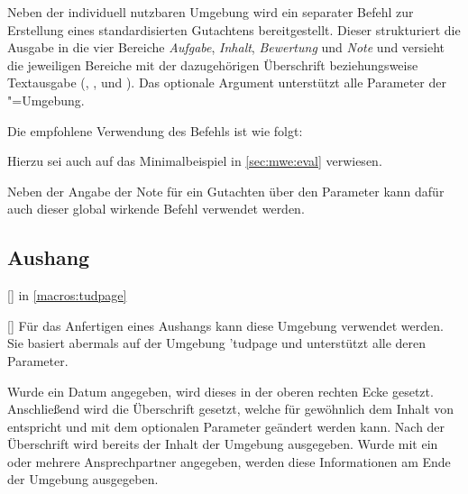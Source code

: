 \documentclass[%
  english,ngerman,%
  headings=optiontoheadandtoc,captions=tableheading,numbers=noenddot,%
  chapterpage,cdfoot,%
]{tudscrman}
\begin{document}
\begin{Declaration}{\LParameter%
}
\printdeclarationlist%
Neben der individuell nutzbaren Umgebung  wird ein 
separater Befehl zur Erstellung eines standardisierten Gutachtens 
bereitgestellt. Dieser strukturiert die Ausgabe in die vier Bereiche 
\emph{Aufgabe}, \emph{Inhalt}, \emph{Bewertung} und \emph{Note} und versieht 
die jeweiligen Bereiche mit der dazugehörigen Überschrift beziehungsweise 
Textausgabe (, ,  und 
). Das optionale Argument unterstützt alle Parameter der 
"=Umgebung.
%
\end{Declaration}
%
\begin{Example}
Die empfohlene Verwendung des Befehls  ist wie folgt:
\begin{code}[escapechar=§]
\end{code}
Hierzu sei auch auf das Minimalbeispiel in \autoref{sec:mwe:eval} verwiesen.
\end{Example}

\begin{Declaration}{}
\printdeclarationlist%
Neben der Angabe der Note für ein Gutachten über den Parameter 
 kann dafür auch dieser global wirkende 
Befehl verwendet werden.
\end{Declaration}

\subsection{Aushang}
\begin{Declaration}{[]}{%
   in \autoref{macros:tudpage}
}
\begin{Declaration}{[]}
\printdeclarationlist%
%
Für das Anfertigen eines Aushangs kann diese Umgebung verwendet werden. Sie 
basiert abermals auf der Umgebung \Environment'{tudpage} und unterstützt alle 
deren Parameter.

Wurde ein Datum angegeben, wird dieses in der oberen rechten Ecke gesetzt. 
Anschließend wird die Überschrift gesetzt, welche für gewöhnlich dem Inhalt von 
 entspricht und mit dem optionalen Parameter 
 geändert werden kann. Nach der Überschrift 
wird bereits der Inhalt der Umgebung ausgegeben. Wurde mit  ein 
oder mehrere Ansprechpartner angegeben, werden diese Informationen am Ende der 
Umgebung ausgegeben.
\end{Declaration}
\end{Declaration}
\end{document}
